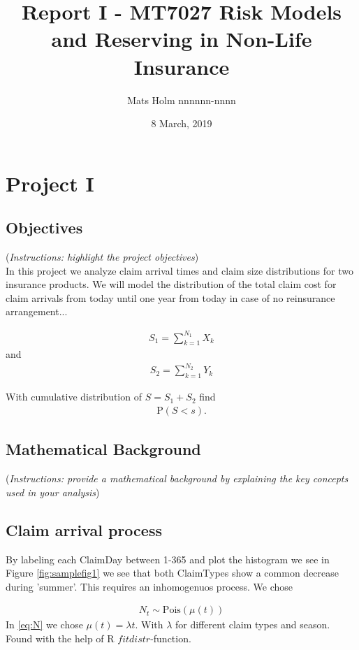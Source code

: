 \documentclass[11pt]{article}
\title{Report I - MT7027 Risk Models and Reserving in Non-Life Insurance}
\author{Mats Holm nnnnnn-nnnn }
\date{8 March, 2019}                                           %
\begin{document}
\maketitle
\section*{Project I}
\subsection*{Objectives}
({\it Instructions: highlight the project objectives})
\\
In this project we analyze claim
arrival times and claim size distributions for two insurance products.
We will model
the distribution of the total claim cost for claim arrivals from today until one year from
today in case of no reinsurance arrangement...

\begin{align} \label{eq:sum1}
	S_1 = \sum_{k=1}^{N_1}  X_k   
\end{align}
and
\begin{align} \label{eq:sum2}
	 S_2 = \sum_{k=1}^{N_2} Y_k
\end{align}

With cumulative distribution of $S = S_1 + S_2$ find
\begin{align*}
	  \mathrm{P}\left(S < s \right). 
\end{align*}


\subsection*{Mathematical Background}
({\it Instructions: provide a mathematical background by explaining the key concepts used in your analysis})

\subsection*{Claim arrival process}
By labeling each ClaimDay between 1-365 and plot the histogram we see in Figure \ref{fig:samplefig1} we see that both ClaimTypes show a common decrease during 'summer'. This requires an inhomogenuos process. We chose

\begin{align}\label{eq:N}
	N_t  \sim  \mathrm{Pois}(\mu(t))
\end{align}
In \eqref{eq:N} we chose $\mu(t) = \lambda t$. With $\lambda$ for different claim types and season. Found with the help of R $fitdistr$-function.
\end{document}
